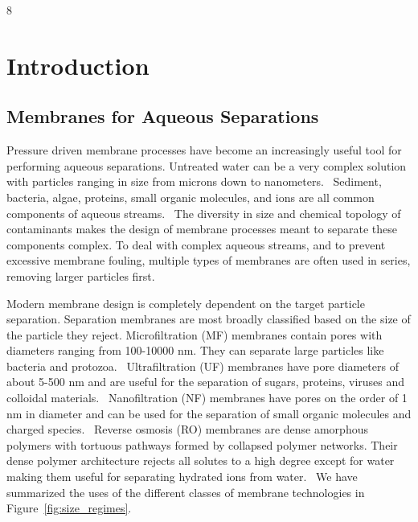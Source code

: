 8\chapter{Introduction}\label{chapter:intro}

  \section{Membranes for Aqueous Separations}
  
  Pressure driven membrane processes have become an increasingly useful tool for
  performing aqueous separations. Untreated water can be a very complex solution
  with particles ranging in size from microns down to nanometers.~\cite{goosen_fouling_2005}
  Sediment, bacteria, algae, proteins, small organic molecules, and ions
  are all common components of aqueous streams.~\cite{werber_materials_2016}
  The diversity in size and chemical topology of contaminants makes the design of
  membrane processes meant to separate these components complex. To deal with 
  complex aqueous streams, and to prevent excessive membrane fouling, multiple 
  types of membranes are often used in series, removing larger particles 
  first.~\cite{suk_membranebased_2006}

  Modern membrane design is completely dependent on the target particle 
  separation. Separation membranes are most broadly classified based on the size of 
  the particle they reject. Microfiltration (MF) membranes contain pores with 
  diameters ranging from 100-10000 nm. They can separate large particles like 
  bacteria and protozoa.~\cite{ma_functionalized_2014} Ultrafiltration (UF) 
  membranes have pore diameters of about 5-500 nm and are useful for the separation
  of sugars, proteins, viruses and colloidal materials.~\cite{yanful_ultrafiltration_2009}
  Nanofiltration (NF) membranes have pores on the order of 1 nm in diameter and can 
  be used for the separation of small organic molecules and charged species.~\cite{van_der_bruggen_review_2003}
  Reverse osmosis (RO) membranes are dense amorphous polymers with tortuous 
  pathways formed by collapsed polymer networks. Their dense polymer architecture 
  rejects all solutes to a high degree except for water making them useful for 
  separating hydrated ions from water.~\cite{warsinger_review_2018} We have 
  summarized the uses of the different classes of membrane technologies in 
  Figure~\ref{fig:size_regimes}.
  
